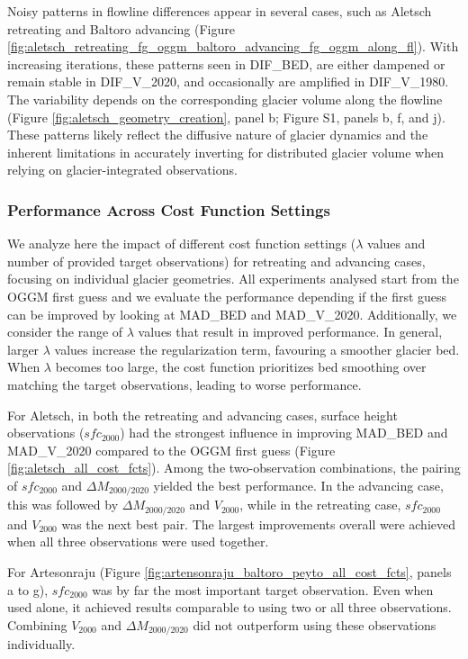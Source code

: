 \documentclass[journal abbreviation, manuscript]{copernicus}
\begin{document}
Noisy patterns in flowline differences appear in several cases, such as Aletsch retreating and Baltoro advancing (Figure \ref{fig:aletsch_retreating_fg_oggm_baltoro_advancing_fg_oggm_along_fl}). With increasing iterations, these patterns seen in DIF\_BED, are either dampened or remain stable in DIF\_V\_2020, and occasionally are amplified in DIF\_V\_1980. The variability depends on the corresponding glacier volume along the flowline (Figure \ref{fig:aletsch_geometry_creation}, panel b; Figure S1, panels b, f, and j). These patterns likely reflect the diffusive nature of glacier dynamics and the inherent limitations in accurately inverting for distributed glacier volume when relying on glacier-integrated observations.


\subsubsection{Performance Across Cost Function Settings}
\label{subsec:differenc_cost_settings_all_geometries}

We analyze here the impact of different cost function settings ($\lambda$ values and number of provided target observations) for retreating and advancing cases, focusing on individual glacier geometries. All experiments analysed start from the OGGM first guess and we evaluate the performance depending if the first guess can be improved by looking at MAD\_BED and MAD\_V\_2020. Additionally, we consider the range of $\lambda$ values that result in improved performance. In general, larger $\lambda$ values increase the regularization term, favouring a smoother glacier bed. When $\lambda$ becomes too large, the cost function prioritizes bed smoothing over matching the target observations, leading to worse performance.

For Aletsch, in both the retreating and advancing cases, surface height observations ($sfc_{2000}$) had the strongest influence in improving MAD\_BED and MAD\_V\_2020 compared to the OGGM first guess (Figure \ref{fig:aletsch_all_cost_fcts}). Among the two-observation combinations, the pairing of $sfc_{2000}$ and $\Delta M_{2000/2020}$ yielded the best performance. In the advancing case, this was followed by $\Delta M_{2000/2020}$ and $V_{2000}$, while in the retreating case, $sfc_{2000}$ and $V_{2000}$ was the next best pair. The largest improvements overall were achieved when all three observations were used together.

For Artesonraju (Figure \ref{fig:artensonraju_baltoro_peyto_all_cost_fcts}, panels a to g), $sfc_{2000}$ was by far the most important target observation. Even when used alone, it achieved results comparable to using two or all three observations. Combining $V_{2000}$ and $\Delta M_{2000/2020}$ did not outperform using these observations individually.
\end{document}
